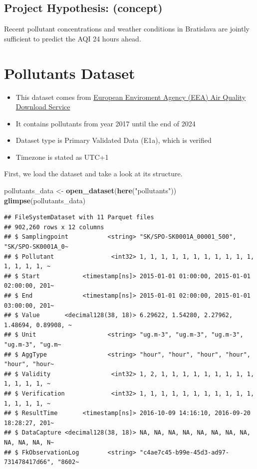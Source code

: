 \documentclass[
]{article}
\newenvironment{Shaded}{\begin{snugshade}}{\end{snugshade}}
\newcommand{\FunctionTok}[1]{\textcolor[rgb]{0.13,0.29,0.53}{\textbf{#1}}}
\newcommand{\NormalTok}[1]{#1}
\newcommand{\OtherTok}[1]{\textcolor[rgb]{0.56,0.35,0.01}{#1}}
\newcommand{\StringTok}[1]{\textcolor[rgb]{0.31,0.60,0.02}{#1}}
\providecommand{\tightlist}{%
  \setlength{\itemsep}{0pt}\setlength{\parskip}{0pt}}
\begin{document}
\subsection{Project Hypothesis:
(concept)}\label{project-hypothesis-concept}

Recent pollutant concentrations and weather conditions in Bratislava are
jointly sufficient to predict the AQI 24 hours ahead.

\section{Pollutants Dataset}\label{pollutants-dataset}

\begin{itemize}
\tightlist
\item
  This dataset comes from
  \href{https://eeadmz1-downloads-webapp.azurewebsites.net/}{European
  Enviroment Agency (EEA) Air Quality Download Service}
\item
  It contains pollutants from year 2017 until the end of 2024
\item
  Dataset type is Primary Validated Data (E1a), which is verified
\item
  Timezone is stated as UTC+1
\end{itemize}

First, we load the dataset and take a look at its structure.

\begin{Shaded}
\begin{Highlighting}[]
\NormalTok{pollutants\_data }\OtherTok{\textless{}{-}} \FunctionTok{open\_dataset}\NormalTok{(}\FunctionTok{here}\NormalTok{(}\StringTok{"pollutants"}\NormalTok{))}
\FunctionTok{glimpse}\NormalTok{(pollutants\_data)}
\end{Highlighting}
\end{Shaded}

\begin{verbatim}
## FileSystemDataset with 11 Parquet files
## 902,260 rows x 12 columns
## $ Samplingpoint           <string> "SK/SPO-SK0001A_00001_500", "SK/SPO-SK0001A_0~
## $ Pollutant                <int32> 1, 1, 1, 1, 1, 1, 1, 1, 1, 1, 1, 1, 1, 1, 1, ~
## $ Start            <timestamp[ns]> 2015-01-01 01:00:00, 2015-01-01 02:00:00, 201~
## $ End              <timestamp[ns]> 2015-01-01 02:00:00, 2015-01-01 03:00:00, 201~
## $ Value       <decimal128(38, 18)> 6.29622, 1.54280, 2.27962, 1.48694, 0.89908, ~
## $ Unit                    <string> "ug.m-3", "ug.m-3", "ug.m-3", "ug.m-3", "ug.m~
## $ AggType                 <string> "hour", "hour", "hour", "hour", "hour", "hour~
## $ Validity                 <int32> 1, 2, 1, 1, 1, 1, 1, 1, 1, 1, 1, 1, 1, 1, 1, ~
## $ Verification             <int32> 1, 1, 1, 1, 1, 1, 1, 1, 1, 1, 1, 1, 1, 1, 1, ~
## $ ResultTime       <timestamp[ns]> 2016-10-09 14:16:10, 2016-09-20 18:28:27, 201~
## $ DataCapture <decimal128(38, 18)> NA, NA, NA, NA, NA, NA, NA, NA, NA, NA, NA, N~
## $ FkObservationLog        <string> "c4ae7c45-b99e-45d3-ad97-731478417d66", "8602~
\end{verbatim}
\end{document}
